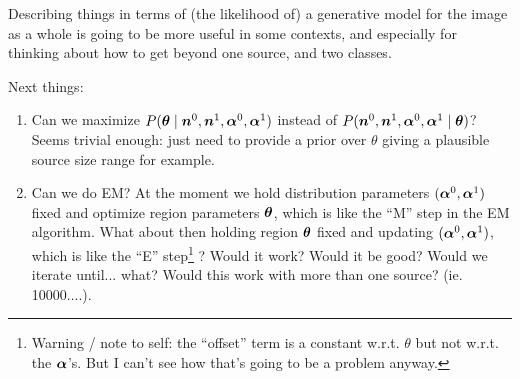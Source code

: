 \documentclass[12pt]{article}
\newcommand{\balpha}{\mbox{\boldmath $\alpha$}}
\newcommand{\btheta}{\mbox{\boldmath $\theta$}}
\newcommand{\bn}{\mbox{\boldmath $n$}}
\begin{document}
Describing things in terms of (the likelihood of) a generative model
for the image as a whole is going to be more useful in some contexts,
and especially for thinking about how to get beyond one source, and
two classes.


Next things:
\begin{enumerate}
\item Can we maximize $P(\btheta \mid \bn^0,  \bn^1, \balpha^0, \balpha^1)$ instead of $P(\bn^0,  \bn^1, \balpha^0, \balpha^1 \mid \btheta)$? Seems trivial enough: just need to provide a prior over $\theta$ giving a plausible source size range for example.
\item Can we do EM? At the moment we hold distribution parameters
  $(\balpha^0,\balpha^1)$ fixed and optimize region parameters
  $\btheta$, which is like the ``M'' step in the EM algorithm. What
  about then holding region $\btheta$ fixed and updating
  $(\balpha^0,\balpha^1)$, which is like the ``E''
  step\footnote{Warning / note to self: the ``offset'' term is a
    constant w.r.t. $\theta$ but not w.r.t. the $\balpha$'s. But I
    can't see how that's going to be a problem anyway.}  ? Would it
  work? Would it be good? Would we iterate until... what? Would this
  work with more than one source? (ie. 10000....).
\end{enumerate}
\end{document}
